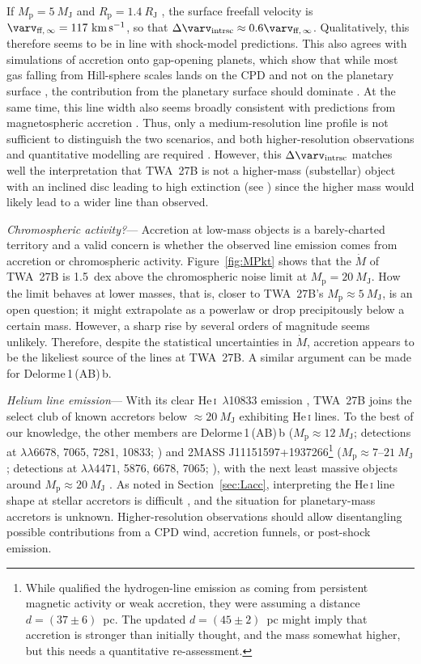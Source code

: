 \documentclass[twocolumn,twocolumnappendix]{aastex631}
\newcommand{\neuI}[1]{{\leavevmode{\boldmath\bfseries#1}}}
\renewcommand{\neuI}[1]{{\leavevmode#1}}
\def\MJ{\ensuremath{M_{\textrm{J}}}\xspace}        %
\def\RJ{\ensuremath{R_{\textrm{J}}}\xspace}        %
\def\HeI{\ensuremath{\mathrm{He}}\,\textsc{i}\xspace}       %
\def\HeIt{\HeI}                     %
\def\HeItVak{\HeI~\ensuremath{\lambda}10833\xspace}         %
\def\Dlrmb{Delorme\,1\,(AB)\,b\xspace}                      %
\def\MPkt{\ensuremath{\dot{M}}\xspace}                               %
\def\MP{\ensuremath{M_{\textrm{p}}}\xspace}        %
\def\RP{\ensuremath{R_{\textrm{p}}}\xspace}        %
\newcommand{\vFfinfty}{\ensuremath{{\varv_{\textrm{ff},\,\infty}}}\xspace}
\def\Dvint{\ensuremath{\Delta \varv_{\mathrm{intrsc}}}\xspace}
\def\kms{\ensuremath{\textrm{km}\,\textrm{s}^{-1}}\xspace}    %
\def\twb{TWA~27B\xspace}
\begin{document}
If $\MP=5~\MJ$ and $\RP=1.4~\RJ$ \citep{luhman23c}, the surface freefall velocity is $\vFfinfty=117~\kms$, so that $\Dvint\approx0.6\vFfinfty$.
%
Qualitatively,  %
this therefore seems to be in line with shock-model predictions.
%
%
This also agrees with simulations of accretion onto gap-opening planets, which show that while most gas falling from Hill-sphere scales lands on the CPD and not on the planetary surface \citep{tanigawa12}, the contribution from the planetary surface should dominate \citep{m22Schock}.
At the same time, this line width also seems broadly consistent with predictions from magnetospheric accretion \citep{thanathibodee19}.
Thus, only a \neuI{medium}-resolution line profile is not sufficient to distinguish the two scenarios, and both higher-resolution observations and quantitative modelling are required \citep{demars23}.
%
%
However, this \Dvint matches well the interpretation that \twb is not a higher-mass (substellar) object with an inclined disc leading to high extinction (see \citealp{luhman07d}) since the higher mass would likely lead to a wider line than observed.


\textit{Chromospheric activity?}---%
Accretion at low-mass objects is a barely-charted territory and a valid concern is whether the observed line emission comes from accretion or chromospheric activity. Figure~\ref{fig:MPkt} shows that the \MPkt of \twb is 1.5~dex above the chromospheric noise limit \citep{manara13,manara17b,venuti19} at $\MP=20~\MJ$. How the limit behaves at lower masses, that is, closer to \twb's $\MP\approx5~\MJ$, is an open question; it might extrapolate as a powerlaw or drop precipitously below a certain mass. However, a sharp rise by several orders of magnitude seems unlikely. Therefore, despite the statistical uncertainties in \MPkt, accretion appears to be the likeliest source of the lines at \twb. A similar argument can be made for \Dlrmb \citep{eriksson20,betti22b,betti22c,ringqvist23}.

\textit{Helium line emission}---%
With its clear \HeItVak emission \citep{luhman23c}, \twb joins the select club of known accretors below $\approx20~\MJ$ exhibiting \HeI lines.
%
%
To the best of our knowledge,
the other members are \Dlrmb
(\neuI{$\MP\approx12~\MJ$;} detections at
%
$\lambda\lambda6678$, 7065, 7281, 10833; \citealp{eriksson20,betti22b})
and 2MASS J11151597+1937266\footnote{\neuI{While \citet{theissen18} qualified the hydrogen-line emission as coming from persistent magnetic activity or weak accretion, they were assuming a distance $d=(37\pm6)$~pc. The updated $d=(45\pm2)$~pc \citep{gEDR3} %
might imply that accretion is stronger than initially thought, and the mass somewhat higher, but this needs a quantitative re-assessment.}}
(\neuI{$\MP\approx7$--$21~\MJ$}; detections at $\lambda\lambda4471$, 5876, 6678, 7065;
\citealp{theissen17,theissen18}),
with the next least massive objects around
$\MP\approx20~\MJ$ \citep{mohanty05,herczeg09}.
%
%
%
%
%
%
%
%
As noted \neuI{in Section~\ref{sec:Lacc}}, interpreting the \HeIt line shape at stellar accretors is difficult \citep{kwan07,erkal22}, and the situation for planetary-mass accretors is unknown.
Higher-resolution observations should allow disentangling possible contributions from a CPD wind, accretion funnels, or post-shock emission.
\end{document}
